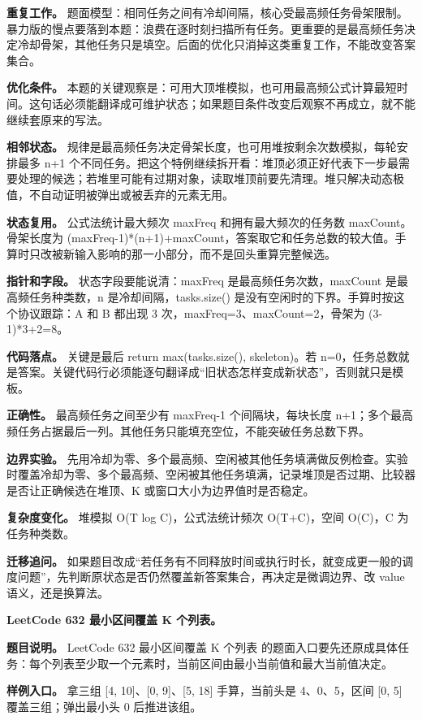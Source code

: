 \textbf{重复工作。} 题面模型：相同任务之间有冷却间隔，核心受最高频任务骨架限制。暴力版的慢点要落到本题：浪费在逐时刻扫描所有任务。更重要的是最高频任务决定冷却骨架，其他任务只是填空。后面的优化只消掉这类重复工作，不能改变答案集合。

\textbf{优化条件。} 本题的关键观察是：可用大顶堆模拟，也可用最高频公式计算最短时间。这句话必须能翻译成可维护状态；如果题目条件改变后观察不再成立，就不能继续套原来的写法。

\textbf{相邻状态。} 规律是最高频任务决定骨架长度，也可用堆按剩余次数模拟，每轮安排最多 n+1 个不同任务。把这个特例继续拆开看：堆顶必须正好代表下一步最需要处理的候选；若堆里可能有过期对象，读取堆顶前要先清理。堆只解决动态极值，不自动证明被弹出或被丢弃的元素无用。

\textbf{状态复用。} 公式法统计最大频次 maxFreq 和拥有最大频次的任务数 maxCount。骨架长度为 (maxFreq-1)*(n+1)+maxCount，答案取它和任务总数的较大值。手算时只改被新输入影响的那一小部分，而不是回头重算完整候选。

\textbf{指针和字段。} 状态字段要能说清：maxFreq 是最高频任务次数，maxCount 是最高频任务种类数，n 是冷却间隔，tasks.size() 是没有空闲时的下界。手算时按这个协议跟踪：A 和 B 都出现 3 次，maxFreq=3、maxCount=2，骨架为 (3-1)*3+2=8。

\textbf{代码落点。} 关键是最后 return max(tasks.size(), skeleton)。若 n=0，任务总数就是答案。关键代码行必须能逐句翻译成“旧状态怎样变成新状态”，否则就只是模板。

\textbf{正确性。} 最高频任务之间至少有 maxFreq-1 个间隔块，每块长度 n+1；多个最高频任务占据最后一列。其他任务只能填充空位，不能突破任务总数下界。

\textbf{边界实验。} 先用冷却为零、多个最高频、空闲被其他任务填满做反例检查。实验时覆盖冷却为零、多个最高频、空闲被其他任务填满，记录堆顶是否过期、比较器是否让正确候选在堆顶、K 或窗口大小为边界值时是否稳定。

\textbf{复杂度变化。} 堆模拟 O(T log C)，公式法统计频次 O(T+C)，空间 O(C)，C 为任务种类数。

\textbf{迁移追问。} 如果题目改成“若任务有不同释放时间或执行时长，就变成更一般的调度问题”，先判断原状态是否仍然覆盖新答案集合，再决定是微调边界、改 value 语义，还是换算法。

\noindent\textbf{LeetCode 632 最小区间覆盖 K 个列表。}

\textbf{题目说明。} LeetCode 632 最小区间覆盖 K 个列表 的题面入口要先还原成具体任务：每个列表至少取一个元素时，当前区间由最小当前值和最大当前值决定。

\textbf{样例入口。} 拿三组 [4, 10]、[0, 9]、[5, 18] 手算，当前头是 4、0、5，区间 [0, 5] 覆盖三组；弹出最小头 0 后推进该组。

